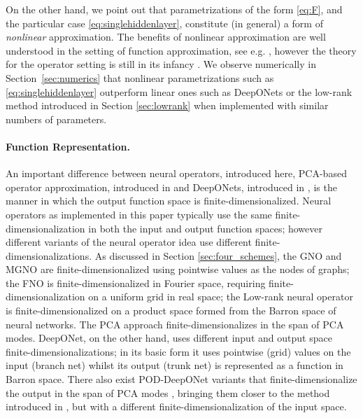 On the other hand, we point out that parametrizations of the form
\eqref{eq:F}, and the particular case \eqref{eq:singlehiddenlayer},  constitute (in general) a form of \textit{nonlinear} approximation. The benefits of nonlinear approximation are well understood in the setting of function approximation, see e.g. \citep{devore1998nonlinear}, however the theory for the operator setting is still in its infancy \citep{bonito2020nonlinear, cohen2020optimal}. We observe numerically in Section~\ref{sec:numerics} that nonlinear parametrizations such as \eqref{eq:singlehiddenlayer} outperform linear ones such as DeepONets or the low-rank method introduced in Section \ref{sec:lowrank} when implemented with similar numbers of parameters.

\paragraph{Function Representation.}
An important difference between neural operators, introduced here, PCA-based
operator approximation, introduced in \cite{Kovachki} and DeepONets, introduced
in \cite{lu2019deeponet}, is the manner in which the output function space is finite-dimensionalized. Neural operators as implemented in this
paper typically use the same finite-dimensionalization in both the input and output function spaces; however different variants of the neural operator idea use different
 finite-dimensionalizations. As discussed in Section \ref{sec:four_schemes}, the GNO and MGNO are finite-dimensionalized using pointwise values as the nodes of graphs; the FNO is
 finite-dimensionalized in Fourier space, requiring finite-dimensionalization on a uniform grid in real space; the Low-rank neural operator is finite-dimensionalized on a product space formed from the
 Barron space of neural networks. The PCA approach finite-dimensionalizes in the span of PCA modes. DeepONet, on the other hand, uses different input and output space finite-dimensionalizations; in its basic form it uses pointwise (grid)
 values on the input (branch net) whilst its output (trunk net) is represented as a function in Barron space. There also exist POD-DeepONet variants that 
 finite-dimensionalize the output in the span of PCA modes \cite{lu2021comprehensive}, bringing them
 closer to the method introduced in \cite{Kovachki}, but with a different 
 finite-dimensionalization of the input space.

